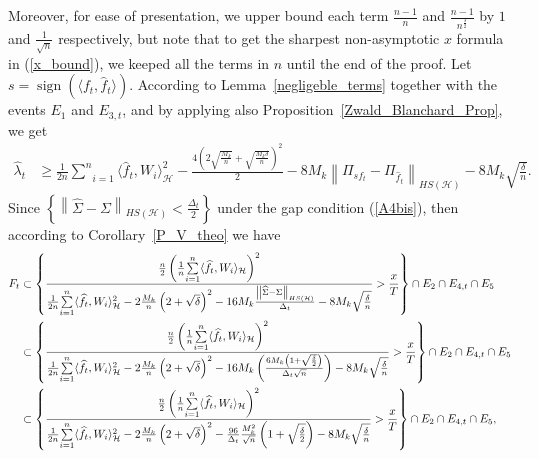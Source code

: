 \documentclass[twoside,11pt]{article}
\newcommand{\Hk}{\mathcal{H}}
\newcommand{\HSk}{HS(\mathcal{H})}
\newcommand{\nb}{n}
\DeclareMathOperator{\sign}{sign}
\begin{document}
Moreover, for ease of presentation, we upper bound each term $\frac{\nb-1}{\nb}$ and $\frac{\nb-1}{\nb^{\frac{3}{2}}}$ by $1$ and $\frac{1}{\sqrt{\nb}}$ respectively, but note that to get the sharpest non-asymptotic $x$ formula in (\ref{x_bound}), we keeped all the terms in $\nb$ until the end of the proof. 
Let $s = \sign(\langle f_t, \hat f_t\rangle)$. According to Lemma~\ref{negligeble_terms} together with the events $E_1$ and $E_{3,t}$, and by applying also Proposition~\ref{Zwald_Blanchard_Prop}, we get 
\begin{align*}
    \widehat{\lambda}_t  &\geq \frac{1}{2\nb} \underset{i=1}{\overset{\nb}{\sum}} \langle \widehat{f}_t, W_i\rangle_{\Hk}^2 - \frac{4 \left( 2\sqrt{\frac{M_k}{\nb}} + \sqrt{\frac{M_k\delta}{\nb}} \right)^2}{2}  - 8  M_k \left \| \Pi_{s f_t} - \Pi_{\widehat{f}_t} \right \|_{\HSk} - 8 M_k \sqrt{\frac \delta \nb}.
\end{align*}
Since $ \left \{ \left \| \widehat{\Sigma} - \Sigma \right \|_{\HSk} < \frac{\Delta_t}{2} \right \}$ under the gap condition (\ref{A4bis}), then according to  Corollary~\ref{P_V_theo}  we have 
\begin{align} 
 F_t   &   \subset     \left\{ \frac{ \frac{\nb}{2} \left(  \frac{1}{\nb} \underset{i=1}{\overset{\nb}{\sum}} \langle \widehat{f}_t , W_i \rangle_{\Hk} \right)^2}{\frac{1}{2\nb} \underset{i=1}{\overset{\nb}{\sum}} \langle \widehat{f}_t, W_i\rangle_{\Hk}^2 - 2\frac{M_k}{\nb} \left( 2 + \sqrt{\delta} \right)^2 - 16  M_k  \frac{\left \| \widehat{\Sigma} - \Sigma \right \|_{\HSk} }{\Delta_t}   - 8 M_k  \sqrt{\frac \delta \nb} }  > \frac{x}{T}  \right\}  \cap E_2  \cap E_{4,t}  \cap E_5  \notag   \\
    &  \subset      \left\{ \frac{ \frac{\nb}{2} \left(  \frac{1}{\nb} \underset{i=1}{\overset{\nb}{\sum}} \langle \widehat{f}_t , W_i \rangle_{\Hk} \right)^2}{\frac{1}{2\nb} \underset{i=1}{\overset{\nb}{\sum}} \langle \widehat{f}_t, W_i\rangle_{\Hk}^2 - 2 \frac{M_k}{\nb} \left( 2 + \sqrt{\delta} \right)^2  - 16   M_k \left(\frac{6 M_k \left( 1 + \sqrt{\frac{\delta}{2}}\right)}{\Delta_t \sqrt{\nb}} \right) - 8 M_k \sqrt{\frac \delta \nb} }  > \frac{x}{T}  \right\}    \cap E_2  \cap E_{4,t}  \cap E_5  \notag   \\
    &  \subset  \left\{ \frac{ \frac{\nb}{2} \left(  \frac{1}{\nb} \underset{i=1}{\overset{\nb}{\sum}} \langle \widehat{f}_t , W_i \rangle_{\Hk} \right)^2}{\frac{1}{2\nb} \underset{i=1}{\overset{\nb}{\sum}} \langle \widehat{f}_t, W_i\rangle_{\Hk}^2 - 2\frac{M_k}{\nb} \left( 2 + \sqrt{\delta} \right)^2  - \frac{96}{\Delta_t}  \frac{M_k^2}{\sqrt{\nb}} \left( 1 + \sqrt{\frac{\delta}{2}} \right) -   8 M_k \sqrt{\frac \delta \nb}}   > \frac{x}{T}  \right\}        \cap E_2  \cap E_{4,t}  \cap E_5   \label{until_Bertail_constant} ,
\end{align}
\end{document}
